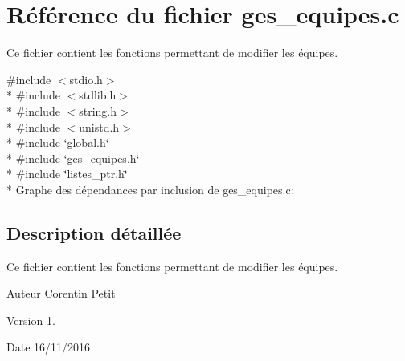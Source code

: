 \hypertarget{a00005}{}\section{Référence du fichier ges\+\_\+equipes.\+c}
\label{a00005}


Ce fichier contient les fonctions permettant de modifier les équipes.  


{\ttfamily \#include $<$stdio.\+h$>$}\\*
{\ttfamily \#include $<$stdlib.\+h$>$}\\*
{\ttfamily \#include $<$string.\+h$>$}\\*
{\ttfamily \#include $<$unistd.\+h$>$}\\*
{\ttfamily \#include \char`\"{}global.\+h\char`\"{}}\\*
{\ttfamily \#include \char`\"{}ges\+\_\+equipes.\+h\char`\"{}}\\*
{\ttfamily \#include \char`\"{}listes\+\_\+ptr.\+h\char`\"{}}\\*
Graphe des dépendances par inclusion de ges\+\_\+equipes.\+c\+:


\subsection{Description détaillée}
Ce fichier contient les fonctions permettant de modifier les équipes. 

\begin{DoxyAuthor}{Auteur}
Corentin Petit 
\end{DoxyAuthor}
\begin{DoxyVersion}{Version}
1. 
\end{DoxyVersion}
\begin{DoxyDate}{Date}
16/11/2016 
\end{DoxyDate}
